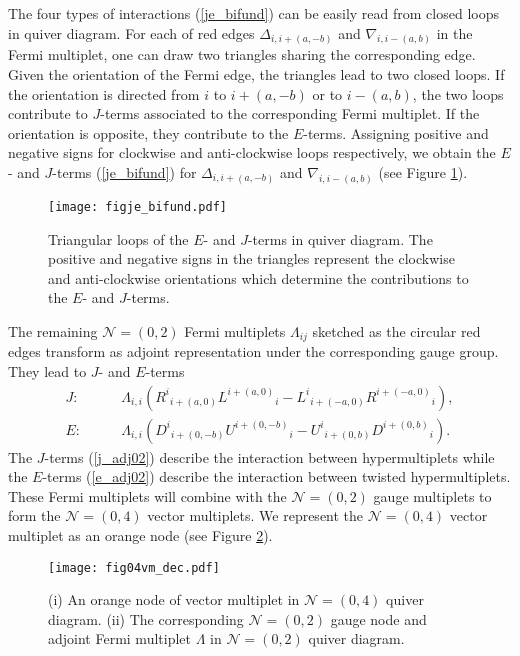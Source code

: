 \documentclass{article}
\numberwithin{equation}{section}
\begin{document}
The four types of interactions (\ref{je_bifund}) can be easily read from closed loops in quiver diagram. 
For each of red edges $\Delta_{i,i+(a,-b)}$ and $\nabla_{i,i-(a,b)}$ in the Fermi multiplet, 
one can draw two triangles sharing the corresponding edge. 
Given the orientation of the Fermi edge, the triangles lead to two closed loops. 
If the orientation is directed from $i$ to $i+(a,-b)$ or to $i-(a,b)$, 
the two loops contribute to $J$-terms associated to the corresponding Fermi multiplet. 
If the orientation is opposite, they contribute to the $E$-terms. 
Assigning positive and negative signs for clockwise and anti-clockwise loops respectively, 
we obtain the $E$- and $J$-terms (\ref{je_bifund})
for $\Delta_{i,i+(a,-b)}$ and $\nabla_{i,i-(a,b)}$ (see Figure \ref{figje_bifund}). 
\begin{figure}
\begin{center}
\texttt{[image: figje\_bifund.pdf]}
\caption{
Triangular loops of the $E$- and $J$-terms in quiver diagram. 
The positive and negative signs in the triangles represent 
the clockwise and anti-clockwise orientations which determine the contributions to the $E$- and $J$-terms. 
}
\label{figje_bifund}
\end{center}
\end{figure}






The remaining $\mathcal{N}=(0,2)$ Fermi multiplets $\Lambda_{ij}$ sketched as the circular red edges 
transform as adjoint representation under the corresponding gauge group. 
They lead to $J$- and $E$-terms 
\begin{align}
\label{j_adj02}
J:\qquad & 
\Lambda_{i, i}\left(
{R^{i}}_{i+(a,0)}{L^{i+(a,0)}}_{i}
-{L^{i}}_{i+(-a,0)}{R^{i+(-a,0)}}_{i}
\right),\\
\label{e_adj02}
E:\qquad &
\Lambda_{i,i}
\left(
{D^{i}}_{i+(0,-b)}{U^{i+(0,-b)}}_{i}
-{U^{i}}_{i+(0,b)}{D^{i+(0,b)}}_{i}
\right).
\end{align}
The $J$-terms (\ref{j_adj02}) describe the interaction between hypermultiplets 
while the $E$-terms (\ref{e_adj02}) describe the interaction between twisted hypermultiplets. 
These Fermi multiplets will combine with the $\mathcal{N}=(0,2)$ gauge multiplets to form the $\mathcal{N}=(0,4)$ vector multiplets. 
We represent the $\mathcal{N}=(0,4)$ vector multiplet as an orange node (see Figure \ref{fig04vm_dec}). 

\begin{figure}
\begin{center}
\texttt{[image: fig04vm\_dec.pdf]}
\caption{(i) An orange node of vector multiplet in $\mathcal{N}=(0,4)$ quiver diagram. 
(ii) The corresponding $\mathcal{N}=(0,2)$ gauge node and adjoint Fermi multiplet $\Lambda$ in $\mathcal{N}=(0,2)$ quiver diagram. 
}
\label{fig04vm_dec}
\end{center}
\end{figure}
\end{document}
